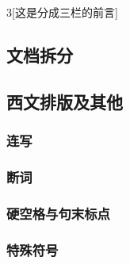 \documentclass{ctexart}
\begin{document}
    \begin{multicols}{3}[\centering 这是分成三栏的前言] 
            \blindtext[2]

            \columnbreak

            \blindtext[2]

            \newpage

            \blindtext[2]
    \end{multicols}

    \blindtext
    \clearpage 


    \subsection{文档拆分}

    \subsection{西文排版及其他}
        \subsubsection{连写}

        \subsubsection{断词}

        \subsubsection{硬空格与句末标点}

        \subsubsection{特殊符号}
\end{document}
